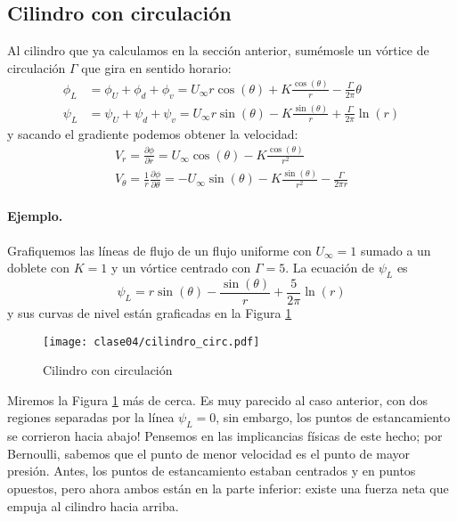 \subsection*{Cilindro con circulación}
Al cilindro que ya calculamos en la sección anterior, sumémosle un vórtice de circulación $\Gamma$ que gira en sentido horario:
%
\begin{align}\label{eq:cilindro_circ_pot}
\phi_L &= \phi_U+\phi_d+\phi_v = U_\infty r\cos(\theta) + K\frac{\cos(\theta)}{r} - \frac{\Gamma}{2\pi}\theta \nonumber\\
\psi_L &= \psi_U+\psi_d+\psi_v = U_\infty r\sin(\theta) - K\frac{\sin(\theta)}{r} + \frac{\Gamma}{2\pi}\ln(r)
\end{align}
%
y sacando el gradiente podemos obtener la velocidad:
%
\begin{align}\label{eq:cilindro_circ_vel}
V_r = \frac{\partial\phi}{\partial r} = U_\infty\cos(\theta) - K\frac{\cos(\theta)}{r^2} \nonumber\\
V_\theta = \frac{1}{r}\frac{\partial\phi}{\partial\theta} = -U_\infty\sin(\theta) - K\frac{\sin(\theta)}{r^2} - \frac{\Gamma}{2\pi r}
\end{align}

\paragraph*{Ejemplo.}
Grafiquemos las líneas de flujo de un flujo uniforme con $U_\infty=1$ sumado a un doblete con $K=1$ y un vórtice centrado con $\Gamma=5$.
La ecuación de $\psi_L$ es
%
\begin{equation}
\psi_L = r\sin(\theta) - \frac{\sin(\theta)}{r} + \frac{5}{2\pi}\ln(r)
\end{equation}
%
y sus curvas de nivel están graficadas en la Figura \ref{fig:cilindro_circ}
%
\begin{figure}[h!]
\centering
\texttt{[image: clase04/cilindro\_circ.pdf]}
\caption{Cilindro con circulación}
\label{fig:cilindro_circ}
\end{figure}

Miremos la Figura \ref{fig:cilindro_circ} más de cerca.
Es muy parecido al caso anterior, con dos regiones separadas por la línea $\psi_L=0$, sin embargo, los puntos de estancamiento se corrieron hacia abajo!
Pensemos en las implicancias físicas de este hecho; por Bernoulli, sabemos que el punto de menor velocidad es el punto de mayor presión.
Antes, los puntos de estancamiento estaban centrados y en puntos opuestos, pero ahora ambos están en la parte inferior: existe una fuerza neta que empuja al cilindro hacia arriba.


